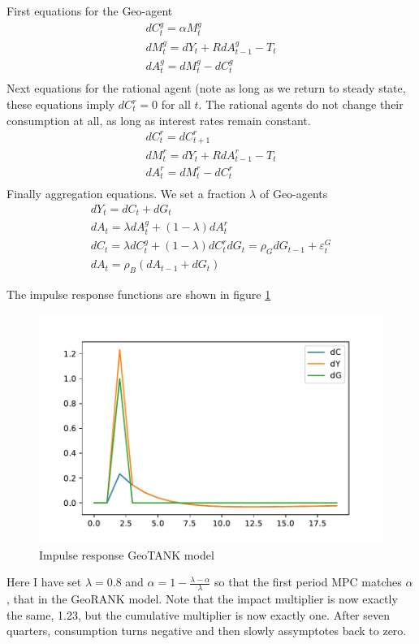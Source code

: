 \documentclass{article}
\begin{document}
First equations for the Geo-agent
\begin{align*}
dC^g_t = \alpha M^g_t \\
dM^g_t =d Y_t + R d A^g_{t-1} -T_t \\
dA^g_t =d M^g_t -d C^g_t \\
\end{align*}
Next equations for the rational agent (note as long as we return to steady state, these equations imply $dC^r_t=0$ for all $t$. The rational agents do not change their consumption at all, as long as interest rates remain constant.
\begin{align*}
dC^r_t = dC^r_{t+1} \\
dM^r_t =d Y_t + R d A^r_{t-1} -T_t \\
dA^r_t =d M^r_t -d C^r_t \\
\end{align*}
Finally aggregation equations. We set a fraction $\lambda$ of Geo-agents
\begin{align*}
dY_t = dC_t + dG_t \\
dA_t = \lambda dA^g_t + (1-\lambda)dA^r_t \\
dC_t = \lambda dC^g_t + (1-\lambda)dC^r_t
dG_t = \rho_G dG_{t-1} + \varepsilon^G_t \\
dA_t = \rho_B (dA_{t-1} + dG_t)
\end{align*}

The impulse response functions are shown in figure \ref{fig:GeoTANK_irf}
\begin{figure} 
	\begin{centering}
		\includegraphics[scale=0.7]{../../Python/DoloCode/GeoTANK/Figures/GeoTANK_irf.pdf}
		\caption{Impulse response GeoTANK model}
		\label{fig:GeoTANK_irf}
	\end{centering}
\end{figure}
Here I have set $\lambda=0.8$ and $\alpha= 1 - \frac{\lambda-\alpha}{\lambda}$ so that the first period MPC matches $\alpha$, that in the GeoRANK model. Note that the impact multiplier is now exactly the same, 1.23, but the cumulative multiplier is now exactly one. After seven quarters, consumption turns negative and then slowly assymptotes back to zero.
\end{document}
